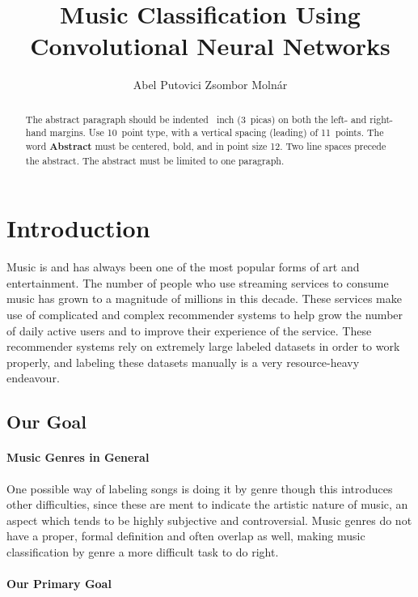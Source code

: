 \documentclass{article}
\title{Music Classification Using Convolutional Neural Networks}
\author{%
Abel Putovici\And
Zsombor Molnár
}
\begin{document}
    \maketitle

    \begin{abstract}
        The abstract paragraph should be indented ~inch (3~picas) on
        both the left- and right-hand margins. Use 10~point type, with a vertical
        spacing (leading) of 11~points. The word \textbf{Abstract} must be centered,
        bold, and in point size 12. Two line spaces precede the abstract. The abstract
        must be limited to one paragraph.
    \end{abstract}

    \section{Introduction}

    Music is and has always been one of the most popular forms of art and
    entertainment. The number of people who use streaming services to consume music
    has grown to a magnitude of millions in this decade. These services make use of
    complicated and complex recommender systems to help grow the number of
    daily active users and to improve their experience of the service. These recommender
    systems rely on extremely large labeled datasets in order to work properly, and
    labeling these datasets manually is a very resource-heavy endeavour.

    \subsection{Our Goal}

    \paragraph{Music Genres in General}

    One possible way of labeling songs is doing it by genre though this introduces
    other difficulties, since these are ment to indicate the artistic nature of music, an
    aspect which tends to be highly subjective and controversial. Music genres do not have a
    proper, formal definition and often overlap as well, making music classification by
    genre a more difficult task to do right.

    \paragraph{Our Primary Goal}
\end{document}
